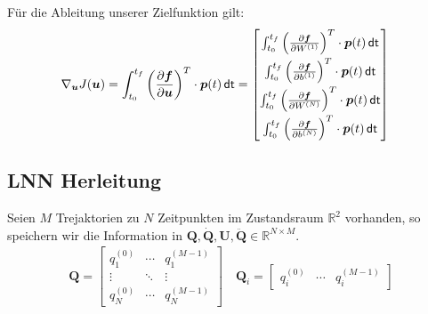 \documentclass[a4paper, 12pt]{scrartcl}
\newcommand{\dt}{\thinspace \mathsf{dt}}
\begin{document}
Für die Ableitung unserer Zielfunktion gilt:
\begin{align*}
    \nabla_{\bm{u}} J(\bm{u})
    &= 
    \int_{t_0}^{t_f} \left(\frac{\partial \bm{f}}{\partial \bm{u}}\right)^T \cdot \bm{p}(t) \dt
    =
    \begin{bmatrix}
        \int_{t_0}^{t_f} 
        \left(
            \frac{\partial \bm{f}}{\partial W^{(1)}}
        \right)^T 
        \cdot 
        \bm{p}(t)
        \dt 
        \\[0.2cm]
        \int_{t_0}^{t_f} 
        \left(
            \frac{\partial \bm{f}}{\partial b^{(1)}}
        \right)^T
        \cdot 
        \bm{p}(t) 
        \dt
        \\[0.2cm]
        \int_{t_0}^{t_f} 
        \left(
            \frac{\partial \bm{f}}{\partial W^{(N)}}
        \right)^T
        \cdot 
        \bm{p}(t) 
        \dt
        \\[0.2cm]
        \int_{t_0}^{t_f} 
        \left(
            \frac{\partial \bm{f}}{\partial b^{(N)}}
        \right)^T
        \cdot 
        \bm{p}(t) 
        \dt
    \end{bmatrix}
\end{align*}

\subsection{LNN Herleitung}

Seien $M$ Trejaktorien zu $N$ Zeitpunkten im Zustandsraum $\mathbb{R}^2$ vorhanden, so speichern
wir die Information in $\bm{Q}, \bm{\dot{Q}}, \bm{U} , \bm{\ddot{Q}} \in \mathbb{R}^{N \times M}$.
%
\begin{align*}
    \bm{Q}
    =
    \begin{bmatrix}
        q_{1}^{(0)} & \cdots & q_{1}^{(M-1)} \\
        \vdots      & \ddots & \vdots \\
        q_{N}^{(0)} & \cdots & q_{N}^{(M-1)}
    \end{bmatrix}
    \quad
    \bm{Q}_i 
    =
    \begin{bmatrix}
        q_{i}^{(0)} & \cdots & q_{i}^{(M-1)}
    \end{bmatrix}
\end{align*}
\end{document}
